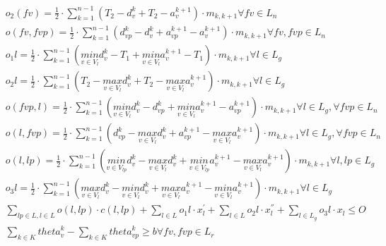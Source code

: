 \begin{align}
  &  o_{2} \left(f v\right) = \frac{1}{2} \cdot \sum_{k = 1}^{n - 1} \left(T_{2} - d_{v}^{k} + T_{2} - a_{v}^{k + 1}\right) \cdot m_{k , k + 1} \forall f v \in L_{n}  \tag{eq\_0030} \\
  &  o \left(f v , f vp\right) = \frac{1}{2} \cdot \sum_{k = 1}^{n - 1} \left(d_{vp}^{k} - d_{v}^{k} + a_{vp}^{k + 1} - a_{v}^{k + 1}\right) \cdot m_{k , k + 1} \forall f v , f vp \in L_{n}  \tag{eq\_0031} \\
  &  o_{1} l = \frac{1}{2} \cdot \sum_{k = 1}^{n - 1} \left(\underset{v \in V_{l}}{min} d_{v}^{k} - T_{1} + \underset{v \in V_{l}}{min} a_{v}^{k + 1} - T_{1}\right) \cdot m_{k , k + 1} \forall l \in L_{g}  \tag{eq\_0032} \\
  &  o_{2} l = \frac{1}{2} \cdot \sum_{k = 1}^{n - 1} \left(T_{2} - \underset{v \in V_{l}}{max} d_{v}^{k} + T_{2} - \underset{v \in V_{l}}{max} a_{v}^{k + 1}\right) \cdot m_{k , k + 1} \forall l \in L_{g}  \tag{eq\_0033} \\
  &  o \left(f vp , l\right) = \frac{1}{2} \cdot \sum_{k = 1}^{n - 1} \left(\underset{v \in V_{l}}{min} d_{v}^{k} - d_{vp}^{k} + \underset{v \in V_{l}}{min} a_{v}^{k + 1} - a_{vp}^{k + 1}\right) \cdot m_{k , k + 1} \forall l \in L_{g} , \forall f vp \in L_{n}  \tag{eq\_0034} \\
  &  o \left(l , f vp\right) = \frac{1}{2} \cdot \sum_{k = 1}^{n - 1} \left(d_{vp}^{k} - \underset{v \in V_{l}}{max} d_{v}^{k} + a_{vp}^{k + 1} - \underset{v \in V_{l}}{max} a_{v}^{k + 1}\right) \cdot m_{k , k + 1} \forall l \in L_{g} , \forall f vp \in L_{n}  \tag{eq\_0035} \\
  &  o \left(l , lp\right) = \frac{1}{2} \cdot \sum_{k = 1}^{n - 1} \left(\underset{v \in V_{lp}}{min} d_{v}^{k} - \underset{v \in V_{l}}{max} d_{v}^{k} + \underset{v \in V_{lp}}{min} a_{v}^{k + 1} - \underset{v \in V_{l}}{max} a_{v}^{k + 1}\right) \cdot m_{k , k + 1} \forall l , lp \in L_{g}  \tag{eq\_0036} \\
  &  o_{3} l = \frac{1}{2} \cdot \sum_{k = 1}^{n - 1} \left(\underset{v \in V_{l}}{max} d_{v}^{k} - \underset{v \in V_{l}}{min} d_{v}^{k} + \underset{v \in V_{l}}{max} a_{v}^{k + 1} - \underset{v \in V_{l}}{min} a_{v}^{k + 1}\right) \cdot m_{k , k + 1} \forall l \in L_{g}  \tag{eq\_0037} \\
  &  \sum_{lp \in L, l \in L} o \left(l , lp\right) \cdot c \left(l , lp\right) + \sum_{l \in L} o_{1} l \cdot x_{l}^{'} + \sum_{l \in L} o_{2} l \cdot x_{l}^{''} + \sum_{l \in L_{g}} o_{3} l \cdot x_{l} \leq O  \tag{eq\_0038} \\
  &  \sum_{k \in K} \mathit{theta}_{v}^{k} - \sum_{k \in K} \mathit{theta}_{vp}^{k} \geq b \forall f v , f vp \in L_{r}  \tag{eq\_0039} \\

\end{align}
